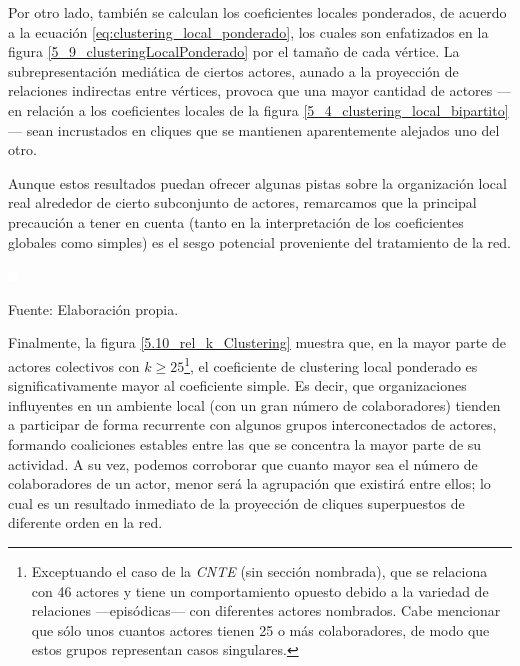 \documentclass[letterpaper, 11pt]{book}
\theoremstyle{definition}
\theoremstyle{remark}
\begin{document}
Por otro lado, también se calculan los coeficientes locales ponderados, de acuerdo a la ecuación \ref{eq:clustering_local_ponderado}, los cuales son enfatizados en la figura \ref{5_9_clusteringLocalPonderado} por el tamaño de cada vértice. 
La subrepresentación mediática de ciertos actores, aunado a la proyección de relaciones indirectas entre vértices, provoca que una mayor cantidad de actores ---en relación a los coeficientes locales de la figura \ref{5_4_clustering_local_bipartito}--- sean incrustados en cliques que se mantienen aparentemente alejados uno del otro. 

Aunque estos resultados puedan ofrecer algunas pistas sobre la organización local real alrededor de cierto subconjunto de actores, remarcamos que la principal precaución a tener en cuenta (tanto en la interpretación de los coeficientes globales como simples) es el sesgo potencial proveniente del tratamiento de la red. 


\begin{minipage}{\linewidth}
\centering
{} \label{5_9_clusteringLocalPonderado}

\includegraphics[scale=0.1]{img/null.png}
\vspace{42em}
\par\bigskip
\small Fuente: Elaboración propia.
\end{minipage}\bigskip


Finalmente, la figura \ref{5.10_rel_k_Clustering}  muestra que, en la mayor parte de actores colectivos con $k \geq 25$\footnote{
    Exceptuando el caso de la \emph{CNTE} (sin sección nombrada), que se relaciona con 46 actores y tiene un comportamiento opuesto debido a la variedad de relaciones ---episódicas--- con diferentes actores nombrados. 
    Cabe mencionar que sólo unos cuantos actores tienen 25 o más colaboradores, de modo que estos grupos representan casos singulares.
}, el coeficiente de clustering local ponderado es significativamente mayor al coeficiente simple. 
Es decir, que organizaciones influyentes en un ambiente local (con un gran número de colaboradores) tienden a participar de forma recurrente con algunos grupos interconectados de actores, formando coaliciones estables entre las que se concentra la mayor parte de su actividad. 
A su vez, podemos corroborar que cuanto mayor sea el número de colaboradores de un actor, menor será la agrupación que existirá entre ellos; lo cual es un resultado inmediato de la proyección de cliques superpuestos de diferente orden en la red. 
\end{document}
